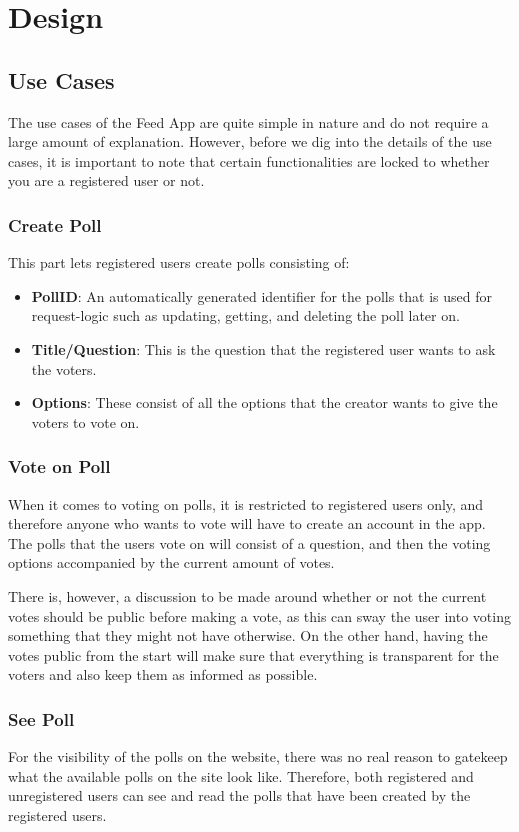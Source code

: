 \section{Design}
\label{sec:design}

\subsection{Use Cases}
The use cases of the Feed App are quite simple in nature and do not require a large amount of explanation. However, before we dig into the details of the use cases, it is important to note that certain functionalities are locked to whether you are a registered user or not.

\subsubsection{Create Poll}
This part lets registered users create polls consisting of:
\begin{itemize}
    \item \textbf{PollID}: An automatically generated identifier for the polls that is used for request-logic such as updating, getting, and deleting the poll later on.
    \item \textbf{Title/Question}: This is the question that the registered user wants to ask the voters.
    \item \textbf{Options}: These consist of all the options that the creator wants to give the voters to vote on.
\end{itemize}

\subsubsection{Vote on Poll}
When it comes to voting on polls, it is restricted to registered users only, and therefore anyone who wants to vote will have to create an account in the app. The polls that the users vote on will consist of a question, and then the voting options accompanied by the current amount of votes. 

There is, however, a discussion to be made around whether or not the current votes should be public before making a vote, as this can sway the user into voting something that they might not have otherwise. On the other hand, having the votes public from the start will make sure that everything is transparent for the voters and also keep them as informed as possible.

\subsubsection{See Poll}
For the visibility of the polls on the website, there was no real reason to gatekeep what the available polls on the site look like. Therefore, both registered and unregistered users can see and read the polls that have been created by the registered users.

